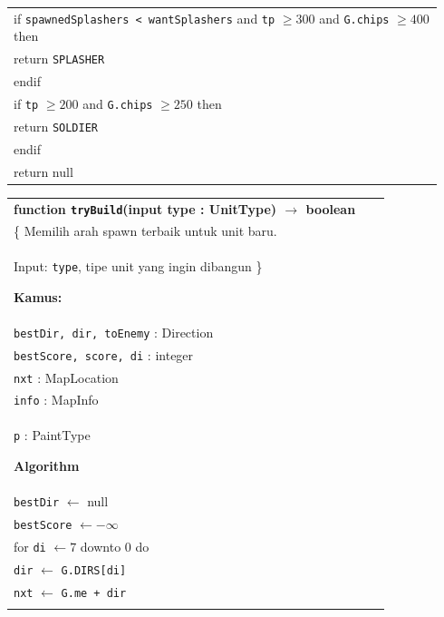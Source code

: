 \documentclass{article}
\newenvironment{pseudobox}
{
\centering
\begin{longtable}{|p{0.94\linewidth}|}
\hline
}
{
\\ \hline
\end{longtable}
\vspace{0.05cm}
}
\begin{document}
\begin{enumerate}[label=\alph*.]
\begin{enumerate}[label=\alph*.]
\begin{pseudobox}
\hspace*{1.5em}if \texttt{spawnedSplashers < wantSplashers} and \texttt{tp} $\geq 300$ and \texttt{G.chips} $\geq 400$ then \\
\hspace*{3em}return \texttt{SPLASHER} \\
\hspace*{1.5em}endif \\

\hspace*{1.5em}if \texttt{tp} $\geq 200$ and \texttt{G.chips} $\geq 250$ then \\
\hspace*{3em}return \texttt{SOLDIER} \\
\hspace*{1.5em}endif \\

\hspace*{1.5em}return null
\end{pseudobox}

\begin{pseudobox}
\textbf{function \texttt{tryBuild}(input type : UnitType) $\rightarrow$ boolean} \\
\{ Memilih arah spawn terbaik untuk unit baru. \\
Input: \texttt{type}, tipe unit yang ingin dibangun
\}

\textbf{Kamus:} \\
\hspace*{1.5em}\texttt{bestDir, dir, toEnemy} : Direction \\
\hspace*{1.5em}\texttt{bestScore, score, di} : integer \\
\hspace*{1.5em}\texttt{nxt} : MapLocation \\
\hspace*{1.5em}\texttt{info} : MapInfo \\
\hspace*{1.5em}\texttt{p} : PaintType

\textbf{Algorithm} \\
\hspace*{1.5em}\texttt{bestDir} $\leftarrow$ null \\
\hspace*{1.5em}\texttt{bestScore} $\leftarrow -\infty$ \\

\hspace*{1.5em}for \texttt{di} $\leftarrow 7$ downto 0 do \\
\hspace*{3em}\texttt{dir} $\leftarrow$ \texttt{G.DIRS[di]} \\
\hspace*{3em}\texttt{nxt} $\leftarrow$ \texttt{G.me + dir} \\


\end{pseudobox}
\end{enumerate}
\end{enumerate}
\end{document}
